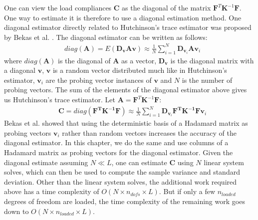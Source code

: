     One can view the load compliances $\bm{C}$ as the diagonal of the matrix $\bm{F}^T \bm{K}^{-1} \bm{F}$. One way to estimate it is therefore to use a diagonal estimation method. One diagonal estimator directly related to Hutchinson's trace estimator was proposed by Bekas et al. \cite{Bekas2007}. The diagonal estimator can be written as follows:
      \begin{align}
       & diag(\bm{A}) = E(\bm{D}_{\bm{v}} \bm{A} \bm{v}) \approx \frac{1}{N} \sum_{i=1}^N \bm{D}_{\bm{v}_i} \bm{A} \bm{v}_i
      \end{align}
    where $diag(\bm{A})$ is the diagonal of $\bm{A}$ as a vector, $\bm{D}_{\bm{v}}$ is the diagonal matrix with a diagonal $\bm{v}$, $\bm{v}$ is a random vector distributed much like in Hutchinson's estimator, $\bm{v}_i$ are the probing vector instances of $\bm{v}$ and $N$ is the number of probing vectors. The sum of the elements of the diagonal estimator above gives us Hutchinson's trace estimator. Let $\bm{A} = \bm{F}^T \bm{K}^{-1} \bm{F}$:
      \begin{align}
       & \bm{C} = diag(\bm{\bm{F}^T \bm{K}^{-1} \bm{F}}) \approx \frac{1}{N} \sum_{i=1}^N \bm{D}_{\bm{v}_i} \bm{\bm{F}^T \bm{K}^{-1} \bm{F}} \bm{v}_i
      \end{align}
    Bekas et al. showed that using the deterministic basis of a Hadamard matrix as probing vectors $\bm{v}_i$ rather than random vectors increases the accuracy of the diagonal estimator. In this chapter, we do the same and use columns of a Hadamard matrix as probing vectors for the diagonal estimator. Given the diagonal estimate assuming $N \ll L$, one can estimate $\bm{C}$ using $N$ linear system solves, which can then be used to compute the sample variance and standard deviation. Other than the linear system solves, the additional work required above has a time complexity of $O(N \times n_{dofs} \times L)$. But if only a few $n_{loaded}$ degrees of freedom are loaded, the time complexity of the remaining work goes down to $O(N \times n_{loaded} \times L)$.

